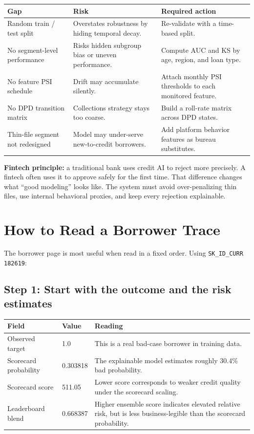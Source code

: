 \documentclass[11pt]{article}
\begin{document}
\begin{tabularx}{\textwidth}{@{}P{0.22\textwidth}P{0.28\textwidth}Y@{}}
\toprule
Gap & Risk & Required action \\
\midrule
Random train / test split & Overstates robustness by hiding temporal decay. & Re-validate with a time-based split. \\
No segment-level performance & Risks hidden subgroup bias or uneven performance. & Compute AUC and KS by age, region, and loan type. \\
No feature PSI schedule & Drift may accumulate silently. & Attach monthly PSI thresholds to each monitored feature. \\
No DPD transition matrix & Collections strategy stays too coarse. & Build a roll-rate matrix across DPD states. \\
Thin-file segment not redesigned & Model may under-serve new-to-credit borrowers. & Add platform behavior features as bureau substitutes. \\
\bottomrule
\end{tabularx}

\textbf{Fintech principle:} a traditional bank uses credit AI to reject more precisely. A fintech often uses it to approve safely for the first time. That difference changes what ``good modeling'' looks like. The system must avoid over-penalizing thin files, use internal behavioral proxies, and keep every rejection explainable.

\section{How to Read a Borrower Trace}

The borrower page is most useful when read in a fixed order. Using \texttt{SK\_ID\_CURR 182619}:

\subsection{Step 1: Start with the outcome and the risk estimates}

\begin{tabularx}{\textwidth}{@{}P{0.25\textwidth}YY@{}}
\toprule
Field & Value & Reading \\
\midrule
Observed target & 1.0 & This is a real bad-case borrower in training data. \\
Scorecard probability & 0.303818 & The explainable model estimates roughly 30.4\% bad probability. \\
Scorecard score & 511.05 & Lower score corresponds to weaker credit quality under the scorecard scaling. \\
Leaderboard blend & 0.668387 & Higher ensemble score indicates elevated relative risk, but is less business-legible than the scorecard probability. \\
\bottomrule
\end{tabularx}
\end{document}

